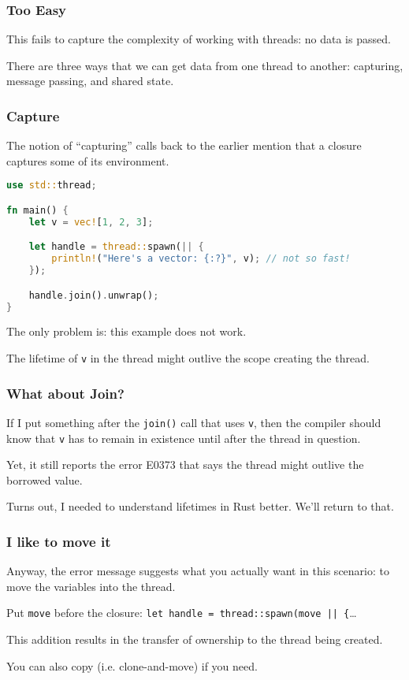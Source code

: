 \begin{frame}
\frametitle{Too Easy}

This fails to capture the complexity of working with threads: no data is passed.

There are three ways that we can get data from one thread to another: capturing, message passing, and shared state.

\end{frame}


\begin{frame}[fragile]
\frametitle{Capture}

The notion of ``capturing'' calls back to the earlier mention that a closure captures some of its environment. 

\begin{lstlisting}[language=Rust]
use std::thread;

fn main() {
    let v = vec![1, 2, 3];

    let handle = thread::spawn(|| {
        println!("Here's a vector: {:?}", v); // not so fast!
    });

    handle.join().unwrap();
}
\end{lstlisting}

The only problem is: this example does not work.

The lifetime of \texttt{v} in the thread might outlive the scope creating the thread.

\end{frame}


\begin{frame}
\frametitle{What about Join?}

If I put something after the \texttt{join()} call that uses \texttt{v}, then the compiler should know that \texttt{v} has to remain in existence until after the thread in question. 

Yet, it still reports the error E0373 that says the thread might outlive the borrowed value. 

Turns out, I needed to understand \alert{lifetimes} in Rust better. We'll return to that.

\end{frame}


\begin{frame}
\frametitle{I like to move it}

Anyway, the error message suggests what you actually want in this scenario: to move the variables into the thread. 

Put \texttt{move} before the closure: \texttt{let handle = thread::spawn(move || \{}\ldots~ 

This addition results in the transfer of ownership to the thread being created. 

You can also copy (i.e. clone-and-move) if you need. 


\end{frame}


